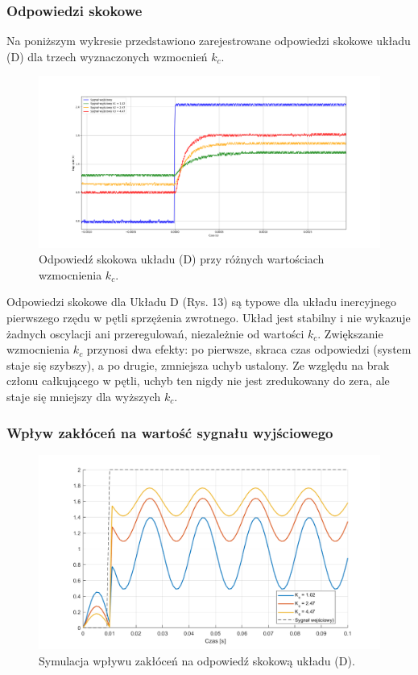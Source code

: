 \documentclass[12pt,a4paper]{article}
\begin{document}
	\subsubsection{Odpowiedzi skokowe}
	Na poniższym wykresie przedstawiono zarejestrowane odpowiedzi skokowe układu (D) dla trzech wyznaczonych wzmocnień \(k_c\).
	
	\begin{figure}[H]
	\centering
	\includegraphics[width=1\linewidth]{zdjecia/OdpSkokD.png}
	\caption{Odpowiedź skokowa układu (D) przy różnych wartościach wzmocnienia \(k_c\).}
	\label{fig:OdpSkokD}
	\end{figure}
	
	Odpowiedzi skokowe dla Układu D (Rys. 13) są typowe dla układu inercyjnego pierwszego rzędu w pętli sprzężenia zwrotnego. Układ jest stabilny i nie wykazuje żadnych oscylacji ani przeregulowań, niezależnie od wartości $k_c$. Zwiększanie wzmocnienia $k_c$ przynosi dwa efekty: po pierwsze, skraca czas odpowiedzi (system staje się szybszy), a po drugie, zmniejsza uchyb ustalony. Ze względu na brak członu całkującego w pętli, uchyb ten nigdy nie jest zredukowany do zera, ale staje się mniejszy dla wyższych $k_c$.
	
	\subsubsection{Wpływ zakłóceń na wartość sygnału wyjściowego}
	
	\begin{figure}[H]
		\centering
		\includegraphics[width=0.8\linewidth]{zdjecia/symOdpSkokD.png}
		\caption{Symulacja wpływu zakłóceń na odpowiedź skokową układu (D).}
		\label{fig:odp_ukladu_D_z_zakloceniami}
	\end{figure}
	
\end{document}
